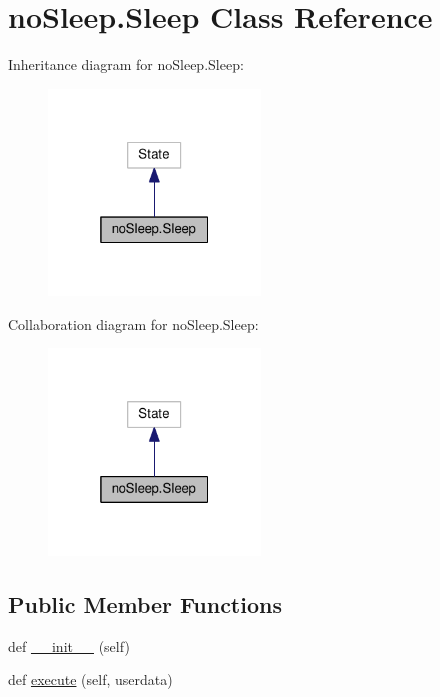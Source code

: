 \hypertarget{classnoSleep_1_1Sleep}{}\section{no\+Sleep.\+Sleep Class Reference}
\label{classnoSleep_1_1Sleep}


Inheritance diagram for no\+Sleep.\+Sleep\+:\nopagebreak
\begin{figure}[H]
\begin{center}
\leavevmode
\includegraphics[width=160pt]{classnoSleep_1_1Sleep__inherit__graph}
\end{center}
\end{figure}


Collaboration diagram for no\+Sleep.\+Sleep\+:\nopagebreak
\begin{figure}[H]
\begin{center}
\leavevmode
\includegraphics[width=160pt]{classnoSleep_1_1Sleep__coll__graph}
\end{center}
\end{figure}
\subsection*{Public Member Functions}
\begin{DoxyCompactItemize}
\item 
def \hyperlink{classnoSleep_1_1Sleep_a5e503c196ce370db0858f3bc1f26a5e4}{\+\_\+\+\_\+init\+\_\+\+\_\+} (self)
\item 
def \hyperlink{classnoSleep_1_1Sleep_a1766a04aa16120154e8f72359d9603a3}{execute} (self, userdata)
\end{DoxyCompactItemize}
